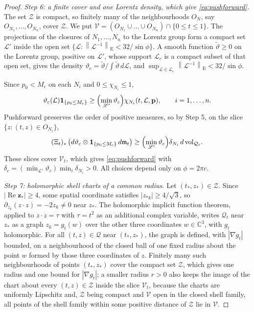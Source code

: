 \documentclass[11pt]{amsart}
\numberwithin{equation}{section}
\theoremstyle{definition}
\newcommand{\C}{\mathbb C}
\newcommand{\bp}{\mathbf p}
\newcommand{\bz}{\mathbf z}
\newcommand{\vol}{\operatorname{vol}}
\newcommand{\Rea}{\operatorname{Re}}
\newcommand{\norm}[1]{\left\|#1\right\|}
\newcommand{\wt}[1]{\widetilde{#1}}
\begin{document}
\begin{proof}
\smallskip
\emph{Step 6: a finite cover and one Lorentz density, which give
\eqref{eq:pushforward}.} The set \(\mathscr Z\) is compact, so finitely many of the neighbourhoods \(O_N\), say
\(O_{N_1},\dots,O_{N_n}\), cover \(\mathscr Z\). We put
\(\mathcal V=(O_{N_1}\cup\dots\cup O_{N_n})\cap{\{0\le t\le1\}}\). The
projections of the closures of \(N_1,\dots,N_n\) to the Lorentz group form
a compact set \(\mathscr L'\) inside the open set
\(\{\mathcal L:\norm{\mathcal L^{-1}}_{\mathrm E}<32/{\sin\phi}\}\). A smooth
function \(\wt\vartheta\ge0\) on the Lorentz group, positive on
\(\mathscr L'\), whose support \(\mathscr L_c\) is a compact subset of that
open set, gives the density
\(\vartheta_c=\wt\vartheta/{\int\wt\vartheta\,d\mathcal L}\), and
\(\sup_{\mathcal L\in\mathscr L_c}\norm{\mathcal L^{-1}}_{\mathrm E}
<32/{\sin\phi}\).

Since \(p_0<M_c\) on each \(N_i\) and
\(0\le\chi_{N_i}\le1\),
\[
 \vartheta_c(\mathcal L)\mathbf1_{\{p_0\le M_c\}}
 \ge\Bigl(\min_{\mathscr L'}\vartheta_c\Bigr)\chi_{N_i}(t,\mathcal L,\bp),
 \qquad i=1,\dots,n.
\]
Pushforward preserves the order of positive measures, so by Step 5, on
the slice \(\{z:(t,z)\in O_{N_i}\}\),
\[
 (\Xi_t)_*\left(d\vartheta_c\otimes
       \mathbf1_{\{p_0\le M_c\}}\,d\mathfrak m_t\right)
 \ge\Bigl(\min_{\mathscr L'}\vartheta_c\Bigr)\delta_{N_i}\,
 {d\vol_{\mathcal Q_t}}.
\]
These slices cover \(\mathcal V_t\), which gives \eqref{eq:pushforward} with
\(\delta_c=(\min_{\mathscr L'}\vartheta_c)\min_i\delta_{N_i}>0\). All choices
depend only on \(\phi=2\pi c\).

\smallskip
\emph{Step 7: holomorphic shell charts of a common radius.} Let
\((t_*,z_*)\in\mathscr Z\). Since \(\lvert\Rea\bz_*\rvert\ge4\), some spatial
coordinate satisfies \(|z_{*k}|\ge4/\sqrt3\), so
\(\partial_{z_k}(z\cdot z)=-2z_k\ne0\) near \(z_*\). The holomorphic implicit
function theorem, applied to \(z\cdot z=\tau\) with \(\tau=t^2\) as an
additional complex variable, writes \(\mathcal Q_t\) near \(z_*\) as a graph
\(z_k=g_t(w)\) over the other three coordinates \(w\in\C^3\), with \(g_t\)
holomorphic. For all \((t,z)\in\mathcal Q\) near \((t_*,z_*)\), the graph is
defined, with \(|\nabla g_t|\) bounded, on a neighbourhood of the closed
ball of one fixed radius about the point \(w\) formed by those three
coordinates of \(z\). Finitely many such neighbourhoods of points \((t_*,z_*)\) cover the compact
set \(\mathscr Z\), which gives one radius and one bound for
\(|\nabla g_t|\); a smaller radius \(r>0\) also keeps the image of the
chart about every \((t,z)\in\mathscr Z\) inside the slice \(\mathcal V_t\),
because the charts are uniformly Lipschitz and, \(\mathscr Z\) being compact
and \(\mathcal V\) open in the closed shell family, all points of the shell
family within some positive distance of \(\mathscr Z\) lie in \(\mathcal V\).


\end{proof}
\end{document}
